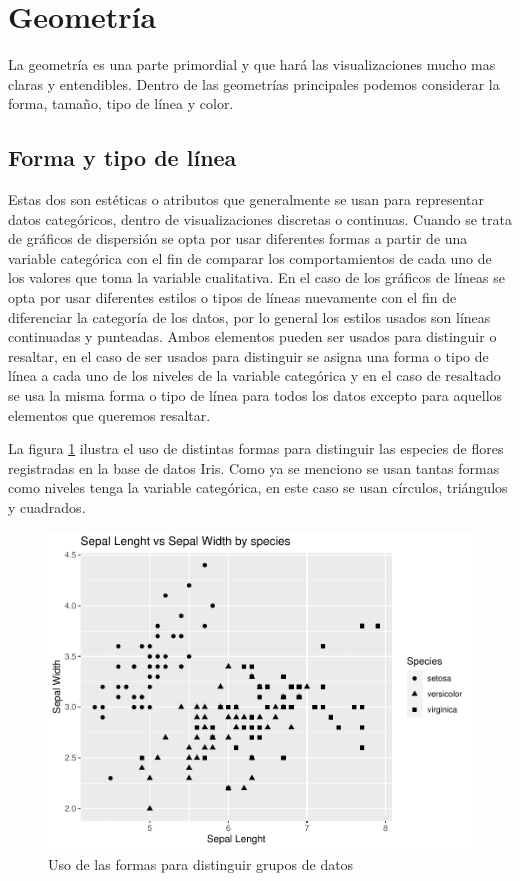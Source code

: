 \documentclass[
]{book}
\begin{document}
\hypertarget{geometruxeda}{%
\section{Geometría}\label{geometruxeda}}

La geometría es una parte primordial y que hará las visualizaciones mucho mas claras y entendibles. Dentro de las geometrías principales podemos considerar la forma, tamaño, tipo de línea y color.

\hypertarget{forma-y-tipo-de-luxednea}{%
\subsection{Forma y tipo de línea}\label{forma-y-tipo-de-luxednea}}

Estas dos son estéticas o atributos que generalmente se usan para representar datos categóricos, dentro de visualizaciones discretas o continuas. Cuando se trata de gráficos de dispersión se opta por usar diferentes formas a partir de una variable categórica con el fin de comparar los comportamientos de cada uno de los valores que toma la variable cualitativa. En el caso de los gráficos de líneas se opta por usar diferentes estilos o tipos de líneas nuevamente con el fin de diferenciar la categoría de los datos, por lo general los estilos usados son líneas continuadas y punteadas. Ambos elementos pueden ser usados para distinguir o resaltar, en el caso de ser usados para distinguir se asigna una forma o tipo de línea a cada uno de los niveles de la variable categórica y en el caso de resaltado se usa la misma forma o tipo de línea para todos los datos excepto para aquellos elementos que queremos resaltar.

La figura \ref{fig:formasparadistinguir-fig} ilustra el uso de distintas formas para distinguir las especies de flores registradas en la base de datos Iris. Como ya se menciono se usan tantas formas como niveles tenga la variable categórica, en este caso se usan círculos, triángulos y cuadrados.

\begin{figure}

{\centering \includegraphics[width=0.8\linewidth]{Lineamientos-Visualizar_files/figure-latex/formasparadistinguir-fig-1} 

}

\caption{Uso de las formas para distinguir grupos de datos}\label{fig:formasparadistinguir-fig}
\end{figure}
\end{document}
